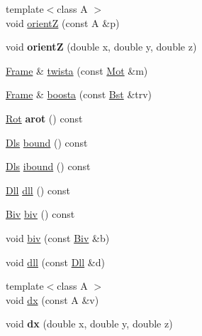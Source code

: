 \begin{DoxyCompactItemize}
\item 
{\footnotesize template$<$class A $>$ }\\void \hyperlink{classvsr_1_1_frame_a741f32fe8f54df5c637cb567680710a6}{orient\-Z} (const A \&p)
\item 
\hypertarget{classvsr_1_1_frame_a0d36016975885c4374fb313f69eb7680}{void {\bfseries orient\-Z} (double x, double y, double z)}\label{classvsr_1_1_frame_a0d36016975885c4374fb313f69eb7680}

\item 
\hyperlink{classvsr_1_1_frame}{Frame} \& \hyperlink{classvsr_1_1_frame_a62e64f000dd7712b61ff68f156e9839d}{twista} (const \hyperlink{namespacevsr_ad4b77d620ed90deefbeab9d4a122667e}{Mot} \&m)
\item 
\hyperlink{classvsr_1_1_frame}{Frame} \& \hyperlink{classvsr_1_1_frame_af5d7d036ef34a54120f45befa0d622cf}{boosta} (const \hyperlink{namespacevsr_a9f737171e19572794ba7b6c12e8e679f}{Bst} \&trv)
\item 
\hypertarget{classvsr_1_1_frame_af3d0d6f3f086a93b1207a0a9d33c348d}{\hyperlink{namespacevsr_aa1af5d33b552dd31499209a8f68548e8}{Rot} {\bfseries arot} () const }\label{classvsr_1_1_frame_af3d0d6f3f086a93b1207a0a9d33c348d}

\item 
\hyperlink{classvsr_1_1_m_v}{Dls} \hyperlink{classvsr_1_1_frame_ac43fc7e8f62bba3fa813fb3ad95212d6}{bound} () const 
\item 
\hyperlink{classvsr_1_1_m_v}{Dls} \hyperlink{classvsr_1_1_frame_a512676d2d70204f968509d71d543c57e}{ibound} () const 
\item 
\hyperlink{namespacevsr_a6c6892b7aec25cfb16492501e2e35b11}{Dll} \hyperlink{classvsr_1_1_frame_acfd841636abdd2ac35ef19c1fd611939}{dll} () const 
\item 
\hyperlink{namespacevsr_ab2f5aee828c6c805b8a86a5b077d192c}{Biv} \hyperlink{classvsr_1_1_frame_a1b8687c1251e52c415d10cbdbec7148d}{biv} () const 
\item 
void \hyperlink{classvsr_1_1_frame_a9278c5922e407726e9ba26bde4a74dec}{biv} (const \hyperlink{namespacevsr_ab2f5aee828c6c805b8a86a5b077d192c}{Biv} \&b)
\item 
void \hyperlink{classvsr_1_1_frame_a21c2637470c4e44209d7b6c204ed2380}{dll} (const \hyperlink{namespacevsr_a6c6892b7aec25cfb16492501e2e35b11}{Dll} \&d)
\item 
{\footnotesize template$<$class A $>$ }\\void \hyperlink{classvsr_1_1_frame_a556da524282d4933e3ca768ca835c352}{dx} (const A \&v)
\item 
\hypertarget{classvsr_1_1_frame_a8b13f459ae1f03751b2ba95dbf9b405d}{void {\bfseries dx} (double x, double y, double z)}\label{classvsr_1_1_frame_a8b13f459ae1f03751b2ba95dbf9b405d}


\end{DoxyCompactItemize}
